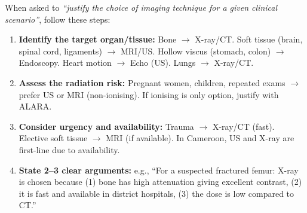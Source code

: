\documentclass[11pt]{article}
\begin{document}
\begin{methode}
When asked to \emph{``justify the choice of imaging technique for a given clinical scenario''}, follow these steps:
\begin{enumerate}
    \item \textbf{Identify the target organ/tissue:} Bone $\to$ X-ray/CT. Soft tissue (brain, spinal cord, ligaments) $\to$ MRI/US. Hollow viscus (stomach, colon) $\to$ Endoscopy. Heart motion $\to$ Echo (US). Lungs $\to$ X-ray/CT.
    \item \textbf{Assess the radiation risk:} Pregnant women, children, repeated exams $\to$ prefer US or MRI (non-ionising). If ionising is only option, justify with ALARA.
    \item \textbf{Consider urgency and availability:} Trauma $\to$ X-ray/CT (fast). Elective soft tissue $\to$ MRI (if available). In Cameroon, US and X-ray are first-line due to availability.
    \item \textbf{State 2--3 clear arguments:} e.g., ``For a suspected fractured femur: X-ray is chosen because (1) bone has high attenuation giving excellent contrast, (2) it is fast and available in district hospitals, (3) the dose is low compared to CT.''
\end{enumerate}
\end{methode}
\end{document}
